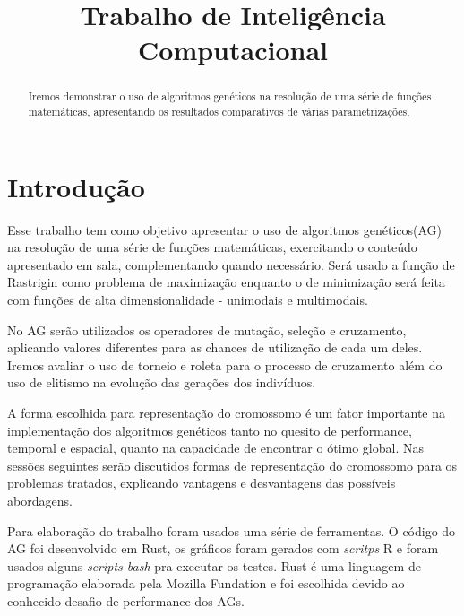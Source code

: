 \documentclass[conference]{IEEEtran}
\begin{document}
\title{Trabalho de Inteligência Computacional}

\author{
}


\maketitle

\begin{abstract}
Iremos demonstrar o uso de algoritmos genéticos na resolução de uma série de funções matemáticas, apresentando os resultados comparativos de várias parametrizações.
\end{abstract}


\IEEEpeerreviewmaketitle



\section{Introdução}

Esse trabalho tem como objetivo apresentar o uso de algoritmos genéticos(AG) na resolução de uma série de funções matemáticas, exercitando o conteúdo apresentado em sala, complementando quando necessário. Será usado a função de Rastrigin como problema de maximização enquanto o de minimização será feita com funções de alta dimensionalidade - unimodais e multimodais.

No AG serão utilizados os operadores de mutação, seleção e cruzamento, aplicando valores diferentes para as chances de utilização de cada um deles. Iremos avaliar o uso de torneio e roleta para o processo de cruzamento além do uso de elitismo na evolução das gerações dos indivíduos.

A forma escolhida para representação do cromossomo é um fator importante na implementação dos algoritmos genéticos tanto no quesito de performance, temporal e espacial, quanto na capacidade de encontrar o ótimo global. Nas sessões seguintes serão discutidos formas de representação do cromossomo para os problemas tratados, explicando vantagens e desvantagens das possíveis abordagens.

Para elaboração do trabalho foram usados uma série de ferramentas. O código do AG foi desenvolvido em Rust, os gráficos foram gerados com \textit{scritps} R e foram usados alguns \textit{scripts bash} pra executar os testes. Rust é uma linguagem de programação elaborada pela Mozilla Fundation e foi escolhida devido ao conhecido desafio de performance dos AGs.
\end{document}
